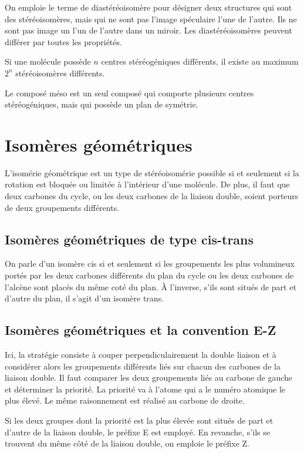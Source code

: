 On emploie le terme de diastéréoisomère pour désigner deux structures qui sont des stéréoisomères, mais qui ne sont pas l'image spéculaire l'une de l'autre.
Ils ne sont pas image un l'un de l'autre dans un miroir.
Les diastéréoisomères peuvent différer par toutes les propriétés.

Si une molécule possède $n$ centres stéréogéniques différents, il existe au maximum $2^n$ stéréoisomères différents.

Le composé méso est un seul composé qui comporte plusieurs centres stéréogéniques, mais qui possède un plan de symétrie.


\section{Isomères géométriques}

L'isomérie géométrique est un type de stéréoisomérie possible si et seulement si la rotation est bloquée ou limitée à l'intérieur d'une molécule.
De plus, il faut que deux carbones du cycle, ou les deux carbones de la liaison double, soient porteurs de deux groupements différents.
\subsection{Isomères géométriques de type cis-trans}

On parle d'un isomère cis si et seulement si les groupements les plus volumineux portés par les deux carbones différents du plan du cycle ou les deux carbones de l'alcène sont placés du même coté du plan.
\`A l'inverse, s'ils sont situés de part et d'autre du plan, il s'agit d'un isomère trans.
\subsection{Isomères géométriques et la convention E-Z} Ici, la stratégie consiste à couper perpendiculairement la double liaison et à considérer alors les groupements différents liés sur chacun des carbones de la liaison double.
Il faut comparer les deux groupements liés au carbone de gauche et déterminer la priorité.
La priorité va à l'atome qui a le numéro atomique le plus élevé.
Le même raisonnement est réalisé au carbone de droite.

Si les deux groupes dont la priorité est la plus élevée sont situés de part et d'autre de la liaison double, le préfixe E est employé.
En revanche, s'ils se trouvent du même côté de la liaison double, on emploie le préfixe Z.

